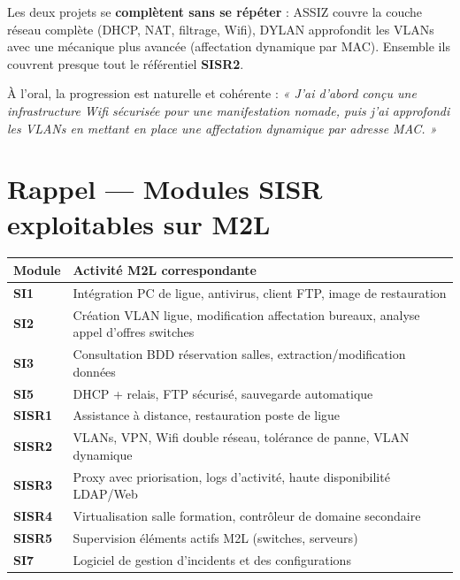 \documentclass[a4paper,12pt]{article}
\begin{document}
\vspace{0.8em}
Les deux projets se \textbf{complètent sans se répéter} :
ASSIZ couvre la couche réseau complète (DHCP, NAT, filtrage, Wifi),
DYLAN approfondit les VLANs avec une mécanique plus avancée (affectation dynamique par MAC).
Ensemble ils couvrent presque tout le référentiel \textbf{SISR2}.

À l'oral, la progression est naturelle et cohérente :
\textit{« J'ai d'abord conçu une infrastructure Wifi sécurisée pour une manifestation nomade,
puis j'ai approfondi les VLANs en mettant en place une affectation dynamique par adresse MAC. »}

\section{Rappel — Modules SISR exploitables sur M2L}

\begin{tabularx}{\textwidth}{>{\bfseries}lX}
    \toprule
    Module & Activité M2L correspondante \\
    \midrule
    SI1 & Intégration PC de ligue, antivirus, client FTP, image de restauration \\
    SI2 & Création VLAN ligue, modification affectation bureaux, analyse appel d'offres switches \\
    SI3 & Consultation BDD réservation salles, extraction/modification données \\
    SI5 & DHCP + relais, FTP sécurisé, sauvegarde automatique \\
    SISR1 & Assistance à distance, restauration poste de ligue \\
    SISR2 & VLANs, VPN, Wifi double réseau, tolérance de panne, VLAN dynamique \\
    SISR3 & Proxy avec priorisation, logs d'activité, haute disponibilité LDAP/Web \\
    SISR4 & Virtualisation salle formation, contrôleur de domaine secondaire \\
    SISR5 & Supervision éléments actifs M2L (switches, serveurs) \\
    SI7 & Logiciel de gestion d'incidents et des configurations \\
    \bottomrule
\end{tabularx}
\end{document}
